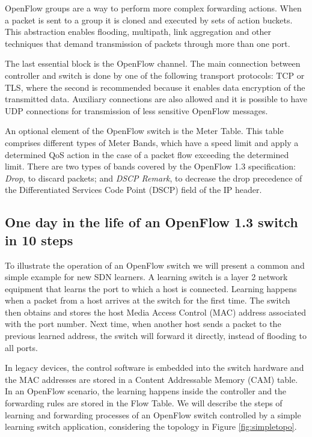 OpenFlow groups are a way to perform more complex forwarding actions. When a packet is sent to a group it is cloned and executed by sets of action buckets. This abstraction enables flooding, multipath, link aggregation and other techniques that demand transmission of packets through more than one port. 

The last essential block is the OpenFlow channel. The main connection between controller and switch is done by one of the following transport protocols: TCP or TLS, where the second is recommended because it enables data encryption of the transmitted data. Auxiliary connections are also allowed and it is possible to have UDP connections for transmission of less sensitive OpenFlow messages.

An optional element of the OpenFlow switch is the Meter Table. This table comprises different types of Meter Bands, which have a speed limit and apply a determined QoS action in the case of a packet flow exceeding the determined limit. There are two types of bands covered by the OpenFlow 1.3 specification: \textit{Drop}, to discard packets; and \textit{DSCP Remark}, to decrease the drop precedence of the Differentiated Services Code Point (DSCP) field of the IP header.

\subsection{One day in the life of an OpenFlow 1.3 switch in 10 steps}

To illustrate the operation of an OpenFlow switch we will present a common and simple example for new SDN learners. A learning switch is a layer 2 network equipment that learns the port to which a host is connected. Learning happens when a packet from a host arrives at the switch for the first time. The switch then obtains and stores the host Media Access Control (MAC) address associated with the port number. Next time, when another host sends a packet to the previous learned address, the switch will forward it directly, instead of flooding to all ports. 

In legacy devices, the control software is embedded into the switch hardware and the MAC addresses are stored in a Content Addressable Memory (CAM) table. In an OpenFlow scenario, the learning happens inside the controller and the forwarding rules are stored in the Flow Table. We will describe the steps of learning and forwarding processes of an OpenFlow switch controlled by a simple learning switch application, considering the topology in Figure \ref{fig:simpletopo}. 

